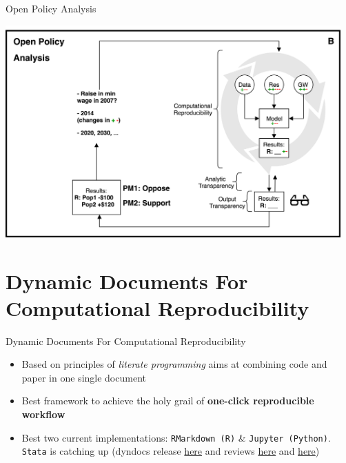 \documentclass[ignorenonframetext,]{beamer}
\providecommand{\tightlist}{%
  \setlength{\itemsep}{0pt}\setlength{\parskip}{0pt}}
\begin{document}
\begin{frame}{Open Policy Analysis}
\protect\hypertarget{open-policy-analysis-1}{}

\centering

\includegraphics[height=3.2in]{../Images/open.png}

\end{frame}

\hypertarget{dynamic-documents-for-computational-reproducibility}{%
\section{Dynamic Documents For Computational
Reproducibility}\label{dynamic-documents-for-computational-reproducibility}}

\begin{frame}[fragile]{Dynamic Documents For Computational
Reproducibility}
\protect\hypertarget{dynamic-documents-for-computational-reproducibility-1}{}

\begin{itemize}
\tightlist
\item
  Based on principles of \emph{literate programming} aims at combining
  code and paper in one single document
\item
  Best framework to achieve the holy grail of \textbf{one-click
  reproducible workflow}
\item
  Best two current implementations: \texttt{RMarkdown\ (R)} \&
  \texttt{Jupyter\ (Python)}. \texttt{Stata} is catching up (dyndocs
  release \href{https://www.stata.com/new-in-stata/markdown/}{here} and
  reviews
  \href{http://data.princeton.edu/stata/markdown/markstat.htm}{here} and
  \href{https://www.bitss.org/2017/09/05/review-of-statas-dyndoc/}{here})
\end{itemize}

\end{frame}
\end{document}
